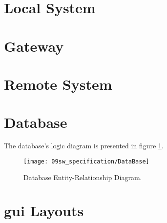 \section{Local System}


\clearpage
\section{Gateway}


\clearpage
\section{Remote System}


\clearpage
\section{Database}
The database's logic diagram is presented in figure \ref{fig:database_er}.

\begin{figure}[H]
	\centering	
	\texttt{[image: 09sw\_specification/DataBase]}
	\caption{Database Entity-Relationship Diagram.}
	\label{fig:database_er}
\end{figure}



\section{\ac{gui} Layouts}






